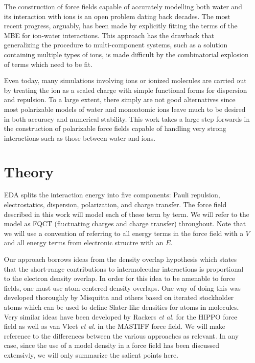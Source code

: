 \documentclass[journal=jacsat,manuscript=article]{achemso}
\begin{document}
The construction of force fields capable of accurately modelling both water and
its interaction with ions is an open problem dating back decades. The most recent
progress, arguably, has been made by explicitly fitting the terms of the MBE for
ion-water interactions.\cite{zhuang2022hydration,caruso2022accurate} This approach
has the drawback that generalizing the procedure to multi-component systems,
such as a solution containing multiple types of ions, is made difficult by
the combinatorial explosion of terms which need to be fit.

Even today, many simulations involving ions or ionized molecules are carried out by treating the
ion as a scaled charge with simple functional forms for dispersion and repulsion.\cite{leontyev2011accounting,bedrov2019molecular}
To a large extent, there simply are not good alternatives since most polarizable
models of water and monoatomic ions leave much to be desired in both accuracy and
numerical stability. This work takes a large step forwards in the construction of
polarizable force fields capable of handling very strong interactions such as those
between water and ions.

\section{Theory}
EDA splits the interaction energy into five components: Pauli repulsion,
electrostatics, dispersion, polarization, and charge transfer. The force
field described in this work will model each of these term by term. We will refer
to the model as FQCT (fluctuating charges and charge transfer) throughout.
Note that we will use a convention of referring to all energy
terms in the force field with a $V$ and all energy terms from electronic structre
with an $E$.

Our approach borrows ideas from the density overlap hypothesis\cite{kim1981dependence,wheatley1990overlap,gavezzotti2002calculation,van2016beyond,van2018new}
which states that the short-range contributions to intermolecular
interactions is proportional to the electron density overlap. In order
for this idea to be amenable to force fields, one must use atom-centered
density overlaps. One way of doing this was developed thoroughly by
Misquitta and others\cite{misquitta2014distributed,misquitta2018isa} based
on iterated stockholder atoms which can be used to define Slater-like
densities for atoms in molecules. Very similar ideas have been developed
by Rackers \textit{et al.}\cite{rackers2021polarizable} for the HIPPO force field
as well as van Vleet \textit{et al.} in the MASTIFF force field.\cite{van2016beyond,van2018new} 
We will make reference to the differences between the various approaches as relevant.
In any case, since the use of a model density in a force field has been discussed extensivly,
we will only summarize the salient points here.
\end{document}
